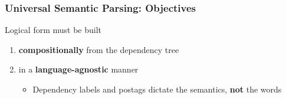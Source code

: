 \documentclass[mathserif,12pt]{beamer}
\begin{document}
\begin{frame}
\frametitle{Universal Semantic Parsing: Objectives}
\large
Logical form must be built

\vspace{1em}
\begin{enumerate}
\item \textbf{compositionally} from the dependency tree 
  \vspace{2em}
\item in a \textbf{language-agnostic} manner
\begin{itemize}
  \item \large Dependency labels and postags dictate the semantics, \textbf{not} the words
\end{itemize}
\end{enumerate}



\end{frame}
\end{document}
